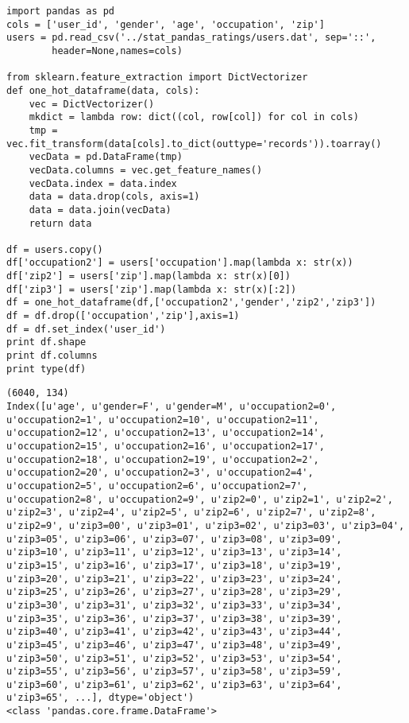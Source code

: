 \documentclass[12pt,fleqn]{article}\usepackage{../common}
\begin{document}
\begin{verbatim}
import pandas as pd
cols = ['user_id', 'gender', 'age', 'occupation', 'zip']
users = pd.read_csv('../stat_pandas_ratings/users.dat', sep='::', 
        header=None,names=cols)

from sklearn.feature_extraction import DictVectorizer
def one_hot_dataframe(data, cols):
    vec = DictVectorizer()
    mkdict = lambda row: dict((col, row[col]) for col in cols)
    tmp = vec.fit_transform(data[cols].to_dict(outtype='records')).toarray()
    vecData = pd.DataFrame(tmp)
    vecData.columns = vec.get_feature_names()
    vecData.index = data.index
    data = data.drop(cols, axis=1)
    data = data.join(vecData)
    return data

df = users.copy()
df['occupation2'] = users['occupation'].map(lambda x: str(x))
df['zip2'] = users['zip'].map(lambda x: str(x)[0])
df['zip3'] = users['zip'].map(lambda x: str(x)[:2])
df = one_hot_dataframe(df,['occupation2','gender','zip2','zip3'])
df = df.drop(['occupation','zip'],axis=1)
df = df.set_index('user_id')
print df.shape
print df.columns
print type(df)
\end{verbatim}

\begin{verbatim}
(6040, 134)
Index([u'age', u'gender=F', u'gender=M', u'occupation2=0', u'occupation2=1', u'occupation2=10', u'occupation2=11', u'occupation2=12', u'occupation2=13', u'occupation2=14', u'occupation2=15', u'occupation2=16', u'occupation2=17', u'occupation2=18', u'occupation2=19', u'occupation2=2', u'occupation2=20', u'occupation2=3', u'occupation2=4', u'occupation2=5', u'occupation2=6', u'occupation2=7', u'occupation2=8', u'occupation2=9', u'zip2=0', u'zip2=1', u'zip2=2', u'zip2=3', u'zip2=4', u'zip2=5', u'zip2=6', u'zip2=7', u'zip2=8', u'zip2=9', u'zip3=00', u'zip3=01', u'zip3=02', u'zip3=03', u'zip3=04', u'zip3=05', u'zip3=06', u'zip3=07', u'zip3=08', u'zip3=09', u'zip3=10', u'zip3=11', u'zip3=12', u'zip3=13', u'zip3=14', u'zip3=15', u'zip3=16', u'zip3=17', u'zip3=18', u'zip3=19', u'zip3=20', u'zip3=21', u'zip3=22', u'zip3=23', u'zip3=24', u'zip3=25', u'zip3=26', u'zip3=27', u'zip3=28', u'zip3=29', u'zip3=30', u'zip3=31', u'zip3=32', u'zip3=33', u'zip3=34', u'zip3=35', u'zip3=36', u'zip3=37', u'zip3=38', u'zip3=39', u'zip3=40', u'zip3=41', u'zip3=42', u'zip3=43', u'zip3=44', u'zip3=45', u'zip3=46', u'zip3=47', u'zip3=48', u'zip3=49', u'zip3=50', u'zip3=51', u'zip3=52', u'zip3=53', u'zip3=54', u'zip3=55', u'zip3=56', u'zip3=57', u'zip3=58', u'zip3=59', u'zip3=60', u'zip3=61', u'zip3=62', u'zip3=63', u'zip3=64', u'zip3=65', ...], dtype='object')
<class 'pandas.core.frame.DataFrame'>
\end{verbatim}
\end{document}
